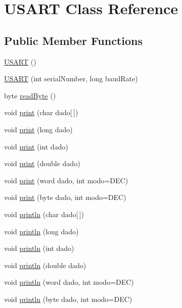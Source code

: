 \hypertarget{class_u_s_a_r_t}{}\section{U\+S\+A\+RT Class Reference}
\label{class_u_s_a_r_t}
\subsection*{Public Member Functions}
\begin{DoxyCompactItemize}
\item 
\hyperlink{class_u_s_a_r_t_a538ccfb4c4ae821f4fd4e87afe9fd96e}{U\+S\+A\+RT} ()
\item 
\hyperlink{class_u_s_a_r_t_a680846cecf681784c7a113d145104c5d}{U\+S\+A\+RT} (int serial\+Number, long baud\+Rate)
\item 
byte \hyperlink{class_u_s_a_r_t_afdd6c6b8cc0b12375978e492f9eeefca}{read\+Byte} ()
\item 
void \hyperlink{class_u_s_a_r_t_aa1c1e5fef5153dd3d4d2794e16433b3f}{print} (char dado\mbox{[}$\,$\mbox{]})
\item 
void \hyperlink{class_u_s_a_r_t_a85c5f9ee155061a1c34bef668c7858e7}{print} (long dado)
\item 
void \hyperlink{class_u_s_a_r_t_aaf26f0a495fa3248035bec99f6871969}{print} (int dado)
\item 
void \hyperlink{class_u_s_a_r_t_a93d4b2375905a82d459bf243d336fbe8}{print} (double dado)
\item 
void \hyperlink{class_u_s_a_r_t_ad80fac8322685697839dfb8a85d52d94}{print} (word dado, int modo=D\+EC)
\item 
void \hyperlink{class_u_s_a_r_t_a247454f341ef377b168436fca1490861}{print} (byte dado, int modo=D\+EC)
\item 
void \hyperlink{class_u_s_a_r_t_ab7a2d9febdda04636cf13ccc2d004475}{println} (char dado\mbox{[}$\,$\mbox{]})
\item 
void \hyperlink{class_u_s_a_r_t_af466ae5e7c9f85ed409274a15c08d69a}{println} (long dado)
\item 
void \hyperlink{class_u_s_a_r_t_a4c59a4f57021fcf5bae5e8a3a963d4e3}{println} (int dado)
\item 
void \hyperlink{class_u_s_a_r_t_a93e3e2c0822214f5cd9f3d65d87400ec}{println} (double dado)
\item 
void \hyperlink{class_u_s_a_r_t_ac554e6cd095025857ab747c63e407454}{println} (word dado, int modo=D\+EC)
\item 
void \hyperlink{class_u_s_a_r_t_ae6893c448241c72ddf6867034657c4c5}{println} (byte dado, int modo=D\+EC)
\end{DoxyCompactItemize}


